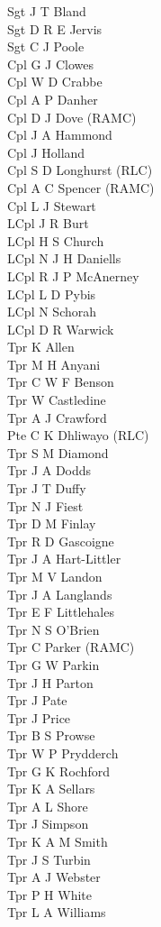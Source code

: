 \begin{multicols}{2}
  \noindent
  Sgt J T Bland \\
  Sgt D R E Jervis \\
  Sgt C J Poole \\
  Cpl G J Clowes \\
  Cpl W D Crabbe \\
  Cpl A P Danher \\
  Cpl D J Dove (RAMC) \\
  Cpl J A Hammond \\
  Cpl J Holland \\
  Cpl S D Longhurst (RLC) \\
  Cpl A C Spencer (RAMC) \\
  Cpl L J Stewart \\
  LCpl J R Burt \\
  LCpl H S Church \\
  LCpl N J H Daniells \\
  LCpl R J P McAnerney \\
  LCpl L D Pybis \\
  LCpl N Schorah \\
  LCpl D R Warwick \\
  Tpr K Allen \\
  Tpr M H Anyani \\
  Tpr C W F Benson \\
  Tpr W Castledine \\
  Tpr A J Crawford \\
  Pte C K Dhliwayo (RLC) \\
  Tpr S M Diamond \\
  Tpr J A Dodds \\
  Tpr J T Duffy \\
  Tpr N J Fiest \\
  Tpr D M Finlay \\
  Tpr R D Gascoigne \\
  Tpr J A Hart-Littler \\
  Tpr M V Landon \\
  Tpr J A Langlands \\
  Tpr E F Littlehales \\
  Tpr N S O'Brien \\
  Tpr C Parker (RAMC) \\
  Tpr G W Parkin \\
  Tpr J H Parton \\
  Tpr J Pate \\
  Tpr J Price \\
  Tpr B S Prowse \\
  Tpr W P Prydderch \\
  Tpr G K Rochford \\
  Tpr K A Sellars \\
  Tpr A L Shore \\
  Tpr J Simpson \\
  Tpr K A M Smith \\
  Tpr J S Turbin \\
  Tpr A J Webster \\
  Tpr P H White \\
  Tpr L A Williams \\
\end{multicols}

